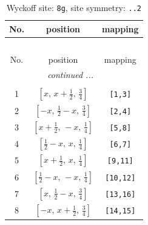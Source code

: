 \documentclass[fleqn,8pt]{jsarticle}
\begin{document}
\renewcommand{\arraystretch}{1.2}
\begin{longtable}{ccc}
\caption{Wyckoff site: {\tt 8g}, site symmetry: {\tt ..2}}
 \\
 \hline \hline
No. & position & mapping \\ \hline \endfirsthead

\multicolumn{2}{l}{\tablename\ \thetable{}} \\
 \hline \hline
No. & position & mapping \\ \hline \endhead

 \hline \hline
\multicolumn{2}{r}{\footnotesize\it continued ...} \\ \endfoot

 \hline \hline
\multicolumn{2}{r}{} \\ \endlastfoot

1 & $\left[ x,\, x + \frac{1}{2},\, \frac{3}{4} \right]$ & {\tt [1,3]} \\ \hline
2 & $\left[ - x,\, \frac{1}{2} - x,\, \frac{3}{4} \right]$ & {\tt [2,4]} \\ \hline
3 & $\left[ x + \frac{1}{2},\, - x,\, \frac{1}{4} \right]$ & {\tt [5,8]} \\ \hline
4 & $\left[ \frac{1}{2} - x,\, x,\, \frac{1}{4} \right]$ & {\tt [6,7]} \\ \hline
5 & $\left[ x + \frac{1}{2},\, x,\, \frac{1}{4} \right]$ & {\tt [9,11]} \\ \hline
6 & $\left[ \frac{1}{2} - x,\, - x,\, \frac{1}{4} \right]$ & {\tt [10,12]} \\ \hline
7 & $\left[ x,\, \frac{1}{2} - x,\, \frac{3}{4} \right]$ & {\tt [13,16]} \\ \hline
8 & $\left[ - x,\, x + \frac{1}{2},\, \frac{3}{4} \right]$ & {\tt [14,15]} \\
\end{longtable}
\renewcommand{\arraystretch}{1.2}
\end{document}
